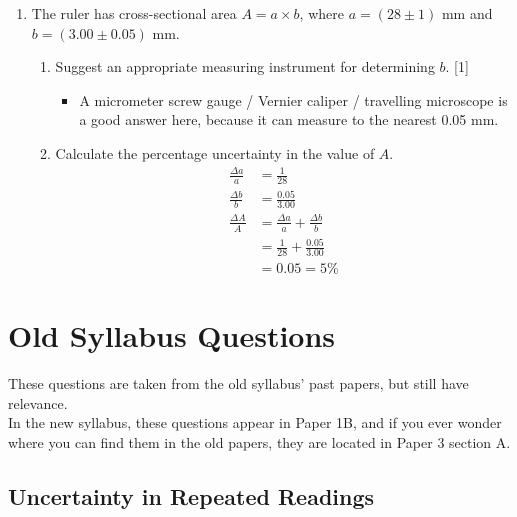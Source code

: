 \documentclass[a4paper,12pt]{article}
\let\oldsection\section
\renewcommand\section{\clearpage\oldsection}
\let\oldsubsection\subsection
\renewcommand\subsection{\clearpage\oldsubsection}
\newcommand{\lb}{\\[8pt]}
\begin{document}
\begin{enumerate}[label=(\alph*)]
\begin{itemize}
        \end{itemize}

        \pagebreak
  \item The ruler has cross-sectional area $A = a\times b$, where $a = (28 \pm 1)$ mm and $b = (3.00 \pm 0.05)$ mm.

        \begin{enumerate}
          \item Suggest an appropriate measuring instrument for determining $b$. \hfill [1]
                \begin{itemize}
                  \item A micrometer screw gauge / Vernier caliper / travelling microscope is a good answer here, because it can measure to the nearest 0.05 mm.
                \end{itemize}
          \item Calculate the percentage uncertainty in the value of $A$.
                \begin{align*}
                  \frac{\Delta a}{a} & = \frac{1}{28}                            \\
                  \frac{\Delta b}{b} & = \frac{0.05}{3.00}                       \\
                  \frac{\Delta A}{A} & = \frac{\Delta a}{a} + \frac{\Delta b}{b} \\
                                     & = \frac{1}{28} + \frac{0.05}{3.00}        \\
                                     & = 0.05 = 5\%
                \end{align*}
        \end{enumerate}

\end{enumerate}

\section{Old Syllabus Questions}

These questions are taken from the old syllabus' past papers, but still have relevance.\lb
In the new syllabus, these questions appear in Paper 1B, and if you ever wonder where you can find them in the old papers, they are located in Paper 3 section A.

\subsection{Uncertainty in Repeated Readings}
\end{document}
